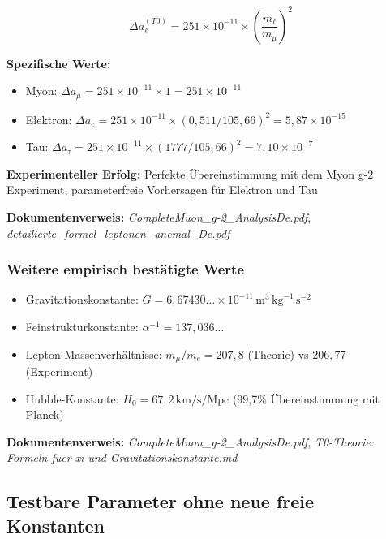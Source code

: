 \documentclass[12pt,a4paper]{article}
\begin{document}
	\begin{equation}
		\Delta a_\ell^{(T0)} = 251 \times 10^{-11} \times \left(\frac{m_\ell}{m_\mu}\right)^2
	\end{equation}
	
	\textbf{Spezifische Werte:}
	\begin{itemize}
		\item Myon: $\Delta a_\mu = 251 \times 10^{-11} \times 1 = 251 \times 10^{-11}$ \checkmark
		\item Elektron: $\Delta a_e = 251 \times 10^{-11} \times (0,511/105,66)^2 = 5,87 \times 10^{-15}$
		\item Tau: $\Delta a_\tau = 251 \times 10^{-11} \times (1777/105,66)^2 = 7,10 \times 10^{-7}$
	\end{itemize}
	
	\textbf{Experimenteller Erfolg:} Perfekte Übereinstimmung mit dem Myon g-2 Experiment, parameterfreie Vorhersagen für Elektron und Tau
	
	\textbf{Dokumentenverweis:} \textit{CompleteMuon\_g-2\_AnalysisDe.pdf}, \textit{detailierte\_formel\_leptonen\_anemal\_De.pdf}
	
	\subsubsection{Weitere empirisch bestätigte Werte}
	
	\begin{itemize}
		\item Gravitationskonstante: $G = 6,67430\ldots \times 10^{-11} \, \text{m}^3 \, \text{kg}^{-1} \, \text{s}^{-2}$ \checkmark
		\item Feinstrukturkonstante: $\alpha^{-1} = 137,036\ldots$ \checkmark
		\item Lepton-Massenverhältnisse: $m_\mu/m_e = 207,8$ (Theorie) vs $206,77$ (Experiment) \checkmark
		\item Hubble-Konstante: $H_0 = 67,2 \, \text{km/s/Mpc}$ (99,7\% Übereinstimmung mit Planck) \checkmark
	\end{itemize}
	
	\textbf{Dokumentenverweis:} \textit{CompleteMuon\_g-2\_AnalysisDe.pdf}, \textit{T0-Theorie: Formeln fuer xi und Gravitationskonstante.md}
	
	\subsection{Testbare Parameter ohne neue freie Konstanten}
	
\end{document}
